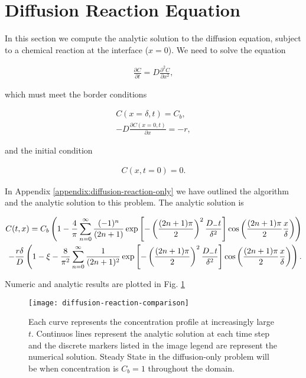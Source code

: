 \section{Diffusion Reaction Equation}
\label{sec:analytic-diffusion-reaction}
In this section we compute the analytic solution to the diffusion equation, subject to a chemical reaction at the interface ($x = 0$).
We need to solve the equation

\begin{align}
\label{eq:diffusion-only}
	\frac{\partial C}{\partial t} = D\frac{\partial^2 C}{\partial x^2},
\end{align}

which must meet the border conditions

\begin{align}
\label{eq:border-conditions-reaction-diffusion}
	C(x = \delta, t) = C_b,\\
	-D\frac{\partial C(x = 0, t)}{\partial x} = -r,
\end{align}

and the initial condition

\begin{align}
	C(x, t = 0) = 0.
\end{align}


In Appendix \ref{appendix:diffusion-reaction-only} we have outlined the algorithm and the analytic solution to this problem. The analytic solution is

\begin{align}\nonumber
	C(t, x) = C_b\left({1- \frac{4}{\pi} \sum_{n=0}^\infty \frac{(-1)^n}{(2n+1)}\exp\left[{-\left({\frac{(2n+1)\pi}{2}}\right)^2\frac{D_- t}{\delta^2}}\right]\cos\left({\frac{(2n+1)\pi}{2} \frac{x}{\delta}}\right)}\right)\\ -\frac{r\delta}{D}\left({1-\xi - \frac{8}{\pi^2}\sum_{n=0}^\infty \frac{1}{(2n+1)^2}\exp\left[{-\left({\frac{(2n+1)\pi}{2}}\right)^2\frac{D_- t}{\delta^2}}\right]\cos\left({\frac{(2n+1)\pi}{2} \frac{x}{\delta}}\right)}\right).
	\label{eq:solution-diffusion-reaction}
\end{align}

Numeric and analytic results are plotted in Fig. \ref{fig:diffusion-reaction-comparison-fixed-r}
\newpage
\begin{figure}[htbp]
\centering
\texttt{[image: diffusion-reaction-comparison]}
\caption{Each curve represents the concentration profile at increasingly large $t$. Continuos lines represent the analytic solution at each time step and the discrete markers listed in the image legend are represent the numerical solution. Steady State in the diffusion-only problem will be when concentration is $C_b=1$ throughout the domain.}
\label{fig:diffusion-reaction-comparison-fixed-r}
\end{figure}


